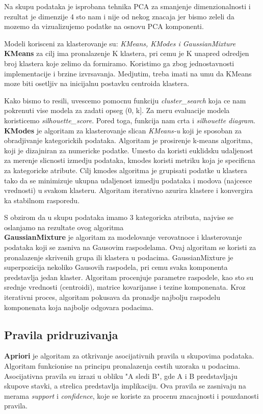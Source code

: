 \documentclass[10pt]{article}
\begin{document}
Na skupu podataka je isprobana tehnika PCA za smanjenje dimenzionalnosti i rezultat je dimenzije 4 sto nam i nije od nekog znacaja jer bismo zeleli da mozemo da vizualizujemo podatke na osnovu PCA komponenti.

Modeli korisceni za klasterovanje su: \textit{KMeans, KModes i GaussianMixture}\\

\textbf{KMeans} za cilj ima pronalazenje K klastera, pri cemu je K unapred odredjen broj klastera koje zelimo da formiramo. Koristimo ga zbog jednostavnosti implementacije i brzine izvrsavanja. Medjutim, treba imati na umu da KMeans moze biti osetljiv na inicijalnu postavku centroida klastera.

Kako bismo to resili, uvescemo pomocnu funkciju \textit{cluster\_search} koja ce nam pokrenuti vise modela za zadati opseg (0, k]. Za meru evaluacije modela koristicemo \textit{silhouette\_score}. Pored toga, funkcija nam crta i \textit{silhouette diagram}.\\ 

\textbf{KModes} je algoritam za klasterovanje slican \textit{KMeans-u} koji je sposoban za obradjivanje kategorickih podataka. Algoritam je prosirenje k-means algoritma, koji je dizajniran za numericke podatke. Umesto da koristi euklidsku udaljenost za merenje slicnosti izmedju podataka, kmodes koristi metriku koja je specificna za kategoricke atribute. Cilj kmodes algoritma je grupisati podatke u klastera tako da se minimizuje ukupna udaljenost izmedju podataka i modova (najcesce vrednosti) u svakom klasteru. Algoritam iterativno azurira klastere i konvergira ka stabilnom rasporedu.

S obzirom da u skupu podataka imamo 3 kategoricka atributa, najvise se oslanjamo na rezultate ovog algoritma\\

\textbf{GaussianMixture} je algoritam za modelovanje verovatnoce i klasterovanje podataka koji se zasniva na Gausovim raspodelama. Ovaj algoritam se koristi za pronalazenje skrivenih grupa ili klastera u podacima.
GaussianMixture je superpozicija nekoliko Gausovih raspodela, pri cemu svaka komponenta predstavlja jedan klaster. Algoritam procenjuje parametre raspodele, kao sto su srednje vrednosti (centroidi), matrice kovarijanse i tezine komponenata. Kroz iterativni proces, algoritam pokusava da pronadje najbolju raspodelu komponenata koja najbolje odgovara podacima.



\subsection{Pravila pridruzivanja}
\textbf{Apriori} je algoritam za otkrivanje asocijativnih pravila u skupovima podataka. Algoritam funkcionise na principu pronalazenja cestih uzoraka u podacima. Asocijativna pravila su izrazi u obliku "A sledi B", gde A i B predstavljaju skupove stavki, a strelica predstavlja implikaciju. Ova pravila se zasnivaju na merama \textit{support} i \textit{confidence}, koje se koriste za procenu znacajnosti i pouzdanosti pravila.
\end{document}
